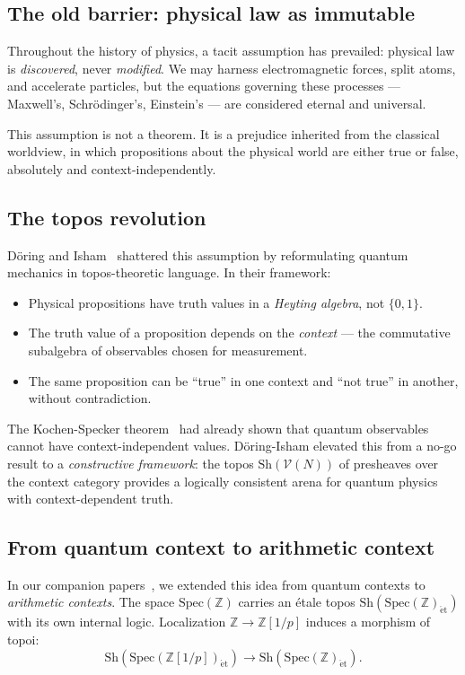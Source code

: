 \documentclass[11pt,a4paper]{article}
\newcommand{\Spec}{\mathrm{Spec}}
\newcommand{\Zp}{\mathbb{Z}[1/p]}
\newcommand{\Sh}{\mathrm{Sh}}
\begin{document}
\subsection{The old barrier: physical law as immutable}

Throughout the history of physics, a tacit assumption has
prevailed: physical law is \emph{discovered}, never
\emph{modified}. We may harness electromagnetic forces, split
atoms, and accelerate particles, but the equations governing
these processes --- Maxwell's, Schr\"odinger's, Einstein's ---
are considered eternal and universal.

This assumption is not a theorem. It is a prejudice inherited
from the classical worldview, in which propositions about the
physical world are either true or false, absolutely and
context-independently.

\subsection{The topos revolution}

D\"oring and Isham~\cite{DoeringIsham2008} shattered this
assumption by reformulating quantum mechanics in topos-theoretic
language. In their framework:
\begin{itemize}
\item Physical propositions have truth values in a
  \emph{Heyting algebra}, not $\{0, 1\}$.
\item The truth value of a proposition depends on the
  \emph{context} --- the commutative subalgebra of observables
  chosen for measurement.
\item The same proposition can be ``true'' in one context and
  ``not true'' in another, without contradiction.
\end{itemize}

The Kochen-Specker theorem~\cite{KochenSpecker1967} had already
shown that quantum observables cannot have context-independent
values. D\"oring-Isham elevated this from a no-go result to a
\emph{constructive framework}: the topos $\Sh(\mathcal{V}(N))$
of presheaves over the context category provides a logically
consistent arena for quantum physics with context-dependent truth.

\subsection{From quantum context to arithmetic context}

In our companion papers~\cite{paper_A,paper_B}, we extended this
idea from quantum contexts to \emph{arithmetic contexts}.
The space $\Spec(\mathbb{Z})$ carries an \'etale topos
$\Sh(\Spec(\mathbb{Z})_{\mathrm{\acute{e}t}})$ with its own
internal logic. Localization $\mathbb{Z} \to \Zp$ induces a
morphism of topoi:
\begin{equation}
  \Sh(\Spec(\Zp)_{\mathrm{\acute{e}t}}) \to
  \Sh(\Spec(\mathbb{Z})_{\mathrm{\acute{e}t}}).
\end{equation}
\end{document}
